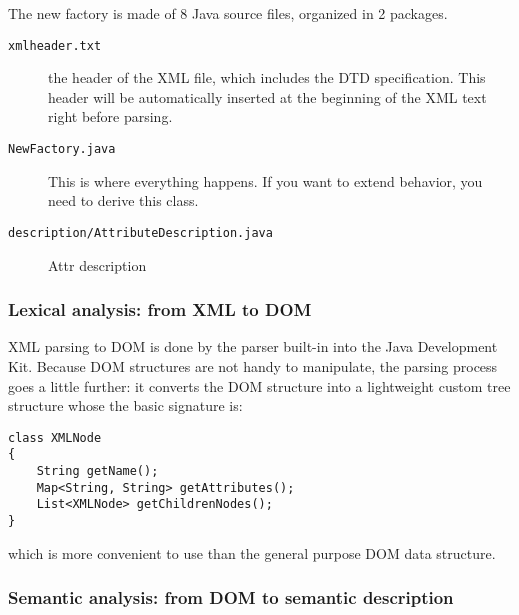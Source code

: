 \documentclass{article}
\newcommand{\code}[1]{\texttt{#1}}
\begin{document}
The new factory is made of 8 Java source files, organized in 2 packages.

\begin{description}
\item[\code{xmlheader.txt}] \dotfill the header of the XML file, which includes the DTD specification. This header will be
	automatically inserted at the beginning of the XML text right before parsing.

\item[\code{NewFactory.java}] \dotfill This is where everything happens. If you want to extend behavior, you need to derive this class.

\item[\code{description/AttributeDescription.java}]  \dotfill Attr description
\end{description}

\subsubsection{Lexical analysis: from XML to DOM}

XML parsing to DOM is done by the parser built-in into the Java Development Kit.
Because DOM structures are not handy to manipulate, the parsing process goes a little
further: it converts the DOM structure into a  lightweight custom tree structure whose the
basic signature is:

\begin{lstlisting}
class XMLNode
{
	String getName();
	Map<String, String> getAttributes();
	List<XMLNode> getChildrenNodes();
}
\end{lstlisting}
which is more convenient to use than the general purpose DOM data structure.

\subsubsection{Semantic analysis: from DOM to semantic description}
\end{document}
